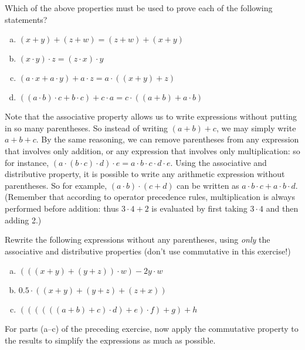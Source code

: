 \begin{exercise}{}
Which of the above properties must be used to prove each of the following statements?
\begin{enumerate}[(a)]
\item
$(x+y)+(z+w) = (z+w)+(x+y)$
\item
$(x \cdot y) \cdot z = ( z \cdot  x) \cdot y$
\item
$(a\cdot x + a \cdot y) + a \cdot z = a \cdot ( (x+y) + z)$
\item
$((a \cdot b) \cdot c + b \cdot c) + c \cdot a = c \cdot ((a+b) + a \cdot b)$
\end{enumerate}
\end{exercise} 

Note that the associative property allows us to write expressions without putting in so many parentheses.  So instead of writing $(a+b)+c$, we may simply write $a+b+c$. By the same reasoning, we can remove parentheses from any expression that involves only addition, or any expression that involves only multiplication: so for instance, $(a \cdot (b \cdot c) \cdot d) \cdot e = a \cdot b \cdot c \cdot d \cdot e$. Using the associative and distributive property, it is possible to write any arithmetic expression without parentheses. So for example, $(a \cdot b) \cdot (c + d)$ can be written as $a \cdot b \cdot c + a \cdot b \cdot d$.  (Remember that according to operator precedence rules, multiplication is always performed before addition: thus $3 \cdot 4 + 2$ is evaluated by first taking $3 \cdot 4$ and then adding 2.)

\begin{exercise}{}
Rewrite the following expressions without any parentheses, using \emph{only} the  associative and distributive properties  (don't use commutative in this exercise!)
\begin{enumerate}[(a)]
\item
$(((x + y) + (y+z))\cdot w) - 2y \cdot w$
\item
$0.5 \cdot ( (x+y) + (y + z) + (z + x))$
\item
$((((((a+b)+c) \cdot d)+ e) \cdot f) + g) + h$
\end{enumerate}
\end{exercise}

\begin{exercise}{}
For parts (a--c) of the preceding exercise, now apply the commutative property to the results to simplify the expressions as much as possible.
\end{exercise}

